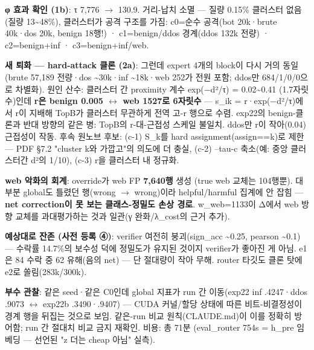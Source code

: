 \textbf{φ 효과 확인 (1b)}: τ 7,776 \ensuremath{\rightarrow} 130.9. 거리-납치 소멸 — 질량 0.15\% 클러스터 없음(질량 13\textasciitilde{}48\%), 클러스터가 공격 구조를 가짐: c0=\allowbreak{}순수 공격(bot 20k·brute 40k·dos 20k, benign 18행!) · c1=\allowbreak{}benign/\allowbreak{}ddos 경계(ddos 132k 전량) · c2=\allowbreak{}benign+\allowbreak{}inf · c3=\allowbreak{}benign+\allowbreak{}inf/\allowbreak{}web.

\textbf{새 퇴화 — hard-attack 클론 (2a)}: 그런데 expert 4개의 block이 다시 거의 동일(brute 57,189 전량·dos \textasciitilde{}30k·inf \textasciitilde{}18k·web 252가 전원 포함; ddos만 684/\allowbreak{}1/\allowbreak{}0/\allowbreak{}0으로 차별화). 원인 산수: 클러스터 간 proximity 계수 exp(−d²/\allowbreak{}τ) =\allowbreak{} 0.02\textasciitilde{}0.41 (1.7자릿수)인데 \textbf{r은 benign 0.005  \ensuremath{\leftrightarrow}  web 1527로 6자릿수} — s\_\allowbreak{}ik =\allowbreak{} r·exp(−d²/\allowbreak{}τ)에서 r이 지배해 TopB가 클러스터 무관하게 전역 고-r 행으로 수렴. exp22의 benign-클론과 반대 방향의 같은 병: TopB의 r-대-근접성 스케일 불일치. ddos만 r이 작아(0.04) 근접성이 작동. 후속 원노브 후보: (c-1) S\_\allowbreak{}k를 hard assignment(assign=\allowbreak{}=\allowbreak{}k)로 제한 — PDF §7.2 "cluster k와 가깝고"의 의도에 더 충실, (c-2) --tau-c 축소(예: 중앙 클러스터간 d²의 1/\allowbreak{}10), (c-3) r을 클러스터 내 정규화.

\textbf{web 악화의 회계}: override가 web FP \textbf{7,640행} 생성 (true web 교체는 104행뿐). 대부분 global도 틀렸던 행(wrong \ensuremath{\rightarrow} wrong)이라 helpful/\allowbreak{}harmful 집계에 안 잡힘 — \textbf{net correction이 못 보는 클래스-정밀도 손상 경로}. w\_\allowbreak{}web=\allowbreak{}1133이 Δ에서 web 방향 교체를 과대평가하는 것과 일관(γ 완화/\allowbreak{}λ\_\allowbreak{}cost의 근거 추가).

\textbf{예상대로 잔존 (사전 등록 ④)}: verifier 여전히 붕괴(sign\_\allowbreak{}acc \textasciitilde{}0.25, pearson \textasciitilde{}0.1) — 수락률 14.7\%의 보수성 덕에 정밀도가 유지된 것이지 verifier가 좋아진 게 아님. e1은 84 수락 중 62 유해(음의 net) — 단 절대량이 작아 무해. router 타깃도 클론 탓에 e2로 쏠림(283k/\allowbreak{}300k).

\textbf{부수 관찰}: 같은 seed·같은 C0인데 global 지표가 run 간 이동(exp22 inf .4247·ddos .9073  \ensuremath{\leftrightarrow}  exp22b .3490·.9407) — CUDA 커널/\allowbreak{}할당 상태에 따른 비트-비결정성이 경계 행을 뒤집는 것으로 보임. 같은-run 비교 원칙(CLAUDE.md)이 이를 정확히 방어함; run 간 절대치 비교 금지 재확인. 비용: 총 71분 (eval\_\allowbreak{}router 754s =\allowbreak{} h\_\allowbreak{}pre 임베딩 — 선언된 "z 더는 cheap 아님" 실측).

